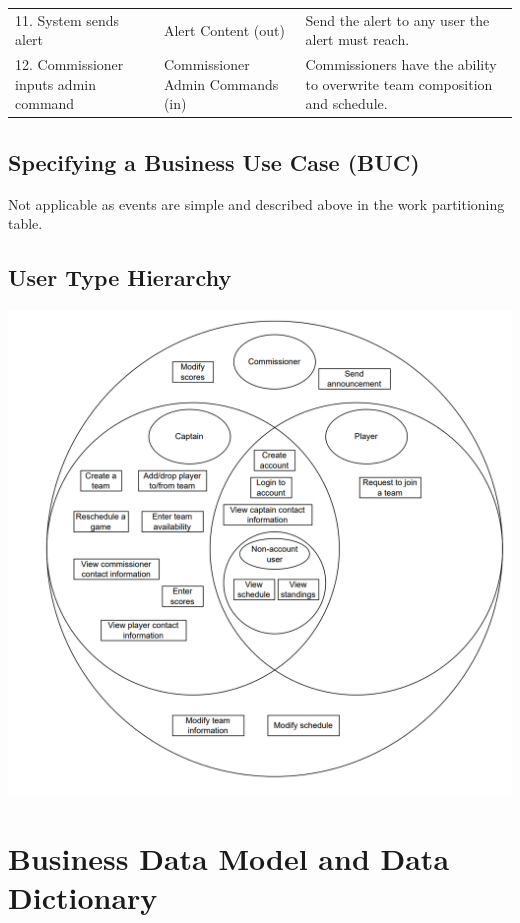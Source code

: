 \documentclass[12pt]{article}
\begin{document}
  \begin{center}
    \begin{tabular}{|m{4cm}|m{4cm}|m{6cm}|}
      \hline
      11. System sends alert & Alert Content (out) & Send the alert to any user the
      alert must reach.\\
      12. Commissioner inputs admin command & Commissioner Admin Commands (in)
      & Commissioners have the ability to overwrite team composition and
      schedule.\\
      \hline
    \end{tabular}
  \end{center}

\subsection{Specifying a Business Use Case (BUC)}
Not applicable as events are simple and described above
in the work partitioning table.

\subsection{User Type Hierarchy}
\includegraphics[scale=1.0]{business_data_model.png}

\section{Business Data Model and Data Dictionary}
\end{document}
